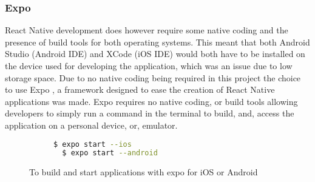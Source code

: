 \subsubsection{Expo}
React Native development does however require some native coding and the presence of build tools for both operating systems. This meant that both Android Studio (Android IDE) and XCode (iOS IDE) would both have to be installed on the device used for developing the application, which was an issue due to low storage space. Due to no native coding being required in this project the choice to use Expo \cite{expo}, a framework designed to ease the creation of React Native applications was made. Expo requires no native coding, or build tools allowing developers to simply run a command in the terminal to build, and, access the application on a personal device, or, emulator.
\begin{figure}[!htbp]
\centering
\begin{subfigure}[b]{0.5\textwidth}
\begin{lstlisting}[language=bash]
  $ expo start --ios
  $ expo start --android
\end{lstlisting}
\end{subfigure}
\caption{To build and start applications with expo for iOS or Android}
\end{figure}
